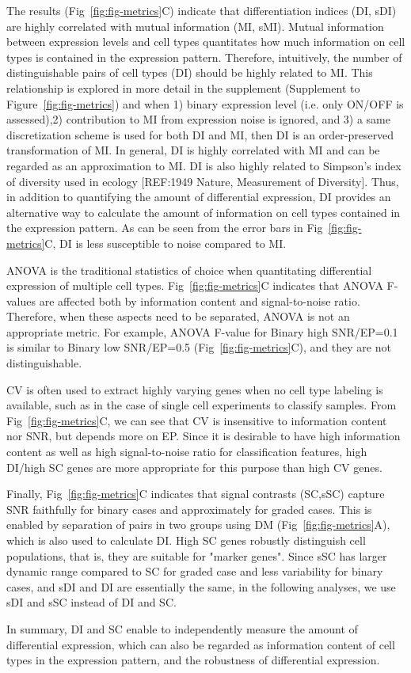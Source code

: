 The results (Fig~\ref{fig:fig-metrics}C) indicate that differentiation indices (DI, sDI) are highly correlated with mutual information (MI, sMI). Mutual information between expression levels and cell types quantitates how much information on cell types is contained in the expression pattern. Therefore, intuitively, the number of distinguishable pairs of cell types (DI) should be highly related to MI. This relationship is explored in more detail in the supplement (Supplement to Figure~\ref{fig:fig-metrics}) and when 1) binary expression level (i.e. only ON/OFF is assessed),2) contribution to MI from expression noise is ignored, and 3) a same discretization scheme is used for both DI and MI, then DI is an order-preserved transformation of MI. In general, DI is highly correlated with MI and can be regarded as an approximation to MI. DI is also highly related to Simpson's index of diversity used in ecology [REF:1949 Nature, Measurement of Diversity]. Thus, in addition to quantifying the amount of differential expression, DI provides an alternative way to calculate the amount of information on cell types contained in the expression pattern. As can be seen from the error bars in Fig~\ref{fig:fig-metrics}C, DI is less susceptible to noise compared to MI. 

ANOVA is the traditional statistics of choice when quantitating differential expression of multiple cell types. Fig~\ref{fig:fig-metrics}C indicates that ANOVA F-values are affected both by information content and signal-to-noise ratio. Therefore, when these aspects need to be separated, ANOVA is not an appropriate metric. For example, ANOVA F-value for Binary high SNR/EP=0.1 is similar to Binary low SNR/EP=0.5 (Fig~\ref{fig:fig-metrics}C), and they are not distinguishable. 

CV is often used to extract highly varying genes when no cell type labeling is available, such as in the case of single cell experiments to classify samples. From Fig~\ref{fig:fig-metrics}C, we can see that CV is insensitive to information content nor SNR, but depends more on EP. Since it is desirable to have high information content as well as high signal-to-noise ratio for classification features, high DI/high SC genes are more appropriate for this purpose than high CV genes. 
% 
% 

Finally, Fig~\ref{fig:fig-metrics}C indicates that signal contrasts (SC,sSC) capture SNR faithfully for binary cases and approximately for graded cases. This is enabled by separation of pairs in two groups using DM (Fig~\ref{fig:fig-metrics}A), which is also used to calculate DI. High SC genes robustly distinguish cell populations, that is, they are suitable for "marker genes". Since sSC has larger dynamic range compared to SC for graded case and less variability for binary cases, and sDI and DI are essentially the same, in the following analyses, we use sDI and sSC instead of DI and SC.

In summary, DI and SC enable to independently measure the amount of differential expression, which can also be regarded as information content of cell types in the expression pattern, and the robustness of differential expression.